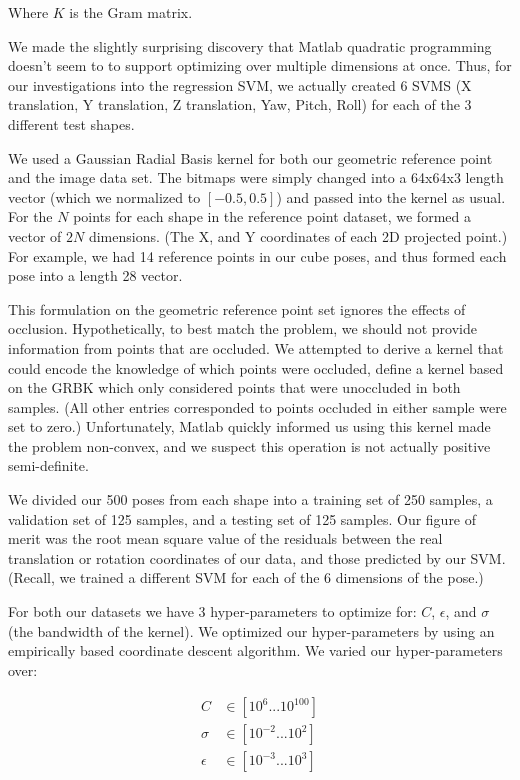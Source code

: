 \documentclass[journal]{IEEEtran}
\begin{document}
\noindent Where $K$ is the Gram matrix.

We made the slightly surprising discovery that Matlab quadratic programming doesn't seem to to support optimizing over multiple dimensions at once. Thus, for our investigations into the regression SVM, we actually created 6 SVMS (X translation, Y translation, Z translation, Yaw, Pitch, Roll) for each of the 3 different test shapes.

We used a Gaussian Radial Basis kernel for both our geometric reference point and the image data set. The bitmaps were simply changed into a 64x64x3 length vector (which we normalized to $[-0.5, 0.5]$) and passed into the kernel as usual. For the $N$ points for each shape in the reference point dataset, we formed a vector of $2N$ dimensions. (The X, and Y coordinates of each 2D projected point.)  For example, we had 14 reference points in our cube poses, and thus formed each pose into a length 28 vector.

This formulation on the geometric reference point set ignores the effects of occlusion. Hypothetically, to best match the problem, we should not provide information from points that are occluded. We attempted to derive a kernel that could encode the knowledge of which points were occluded, define a kernel based on the GRBK which only considered points that were unoccluded in both samples. (All other entries corresponded to points occluded in either sample were set to zero.)
Unfortunately, Matlab quickly informed us using this kernel made the problem non-convex, and we suspect this operation is not actually positive semi-definite.

We divided our 500 poses from each shape into a training set of 250 samples, a validation set of 125 samples, and a testing set of 125 samples. Our figure of merit was the root mean square value of the residuals between the real translation or rotation coordinates of our data, and those predicted by our SVM. (Recall, we trained a different SVM for each of the 6 dimensions of the pose.)

For both our datasets we have 3 hyper-parameters to optimize for: $C$, $\epsilon$, and $\sigma$ (the bandwidth of the kernel). We optimized our hyper-parameters by using an empirically based coordinate descent algorithm. We varied our hyper-parameters over:

\begin{align*}
C &\in [10^{6} ... 10^{100}]\\
\sigma &\in [10^{-2} ... 10^{2}]\\
\epsilon &\in [10^{-3} ... 10^{3}]
\end{align*}
\end{document}
